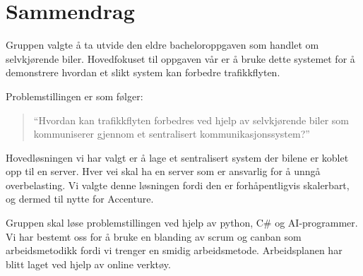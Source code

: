 \chapter{Sammendrag}
Gruppen valgte å ta utvide den eldre bacheloroppgaven som handlet om selvkjørende biler. Hovedfokuset til oppgaven vår er å bruke dette systemet for å demonstrere hvordan et slikt system kan forbedre trafikkflyten.

Problemstillingen er som følger:
\begin{quotation}
    ``Hvordan kan trafikkflyten forbedres ved hjelp av selvkjørende biler som kommuniserer gjennom et sentralisert kommunikasjonssystem?''
\end{quotation}

Hovedløsningen vi har valgt er å lage et sentralisert system der bilene er koblet opp til en server. Hver vei skal ha en server  som er ansvarlig for å unngå overbelasting. Vi valgte denne løsningen fordi den er forhåpentligvis skalerbart, og dermed til nytte for Accenture. 

Gruppen skal løse problemstillingen ved hjelp av python, C\# og AI-programmer. Vi har bestemt oss for å bruke en blanding av scrum og canban som arbeidsmetodikk fordi vi trenger en smidig arbeidsmetode. Arbeidsplanen har blitt laget ved hjelp av online verktøy.
